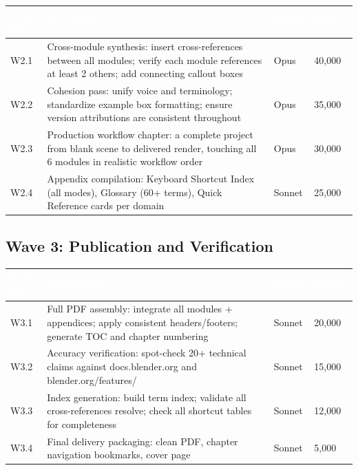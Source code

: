 \documentclass[11pt,letterpaper]{article}
\newcommand{\tableheader}[1]{\textbf{\sffamily\textcolor{white}{#1}}}
\begin{document}
\begin{center}
\begin{tabularx}{\textwidth}{L{2.5cm}XC{2cm}C{2cm}}
\toprule
{}
\tableheader{Task ID} & \tableheader{Description} & \tableheader{Model} & \tableheader{Tokens} \\
\midrule
W2.1 & Cross-module synthesis: insert cross-references between all modules; verify each module references at least 2 others; add connecting callout boxes & Opus & 40,000 \\
W2.2 & Cohesion pass: unify voice and terminology; standardize example box formatting; ensure version attributions are consistent throughout & Opus & 35,000 \\
W2.3 & Production workflow chapter: a complete project from blank scene to delivered render, touching all 6 modules in realistic workflow order & Opus & 30,000 \\
W2.4 & Appendix compilation: Keyboard Shortcut Index (all modes), Glossary (60+ terms), Quick Reference cards per domain & Sonnet & 25,000 \\
\bottomrule
\end{tabularx}
\end{center}

\subsection{Wave 3: Publication and Verification}

\begin{center}
\begin{tabularx}{\textwidth}{L{2.5cm}XC{2cm}C{2cm}}
\toprule
{}
\tableheader{Task ID} & \tableheader{Description} & \tableheader{Model} & \tableheader{Tokens} \\
\midrule
W3.1 & Full PDF assembly: integrate all modules + appendices; apply consistent headers/footers; generate TOC and chapter numbering & Sonnet & 20,000 \\
W3.2 & Accuracy verification: spot-check 20+ technical claims against docs.blender.org and blender.org/features/ & Sonnet & 15,000 \\
W3.3 & Index generation: build term index; validate all cross-references resolve; check all shortcut tables for completeness & Sonnet & 12,000 \\
W3.4 & Final delivery packaging: clean PDF, chapter navigation bookmarks, cover page & Sonnet & 5,000 \\
\bottomrule
\end{tabularx}
\end{center}
\end{document}
